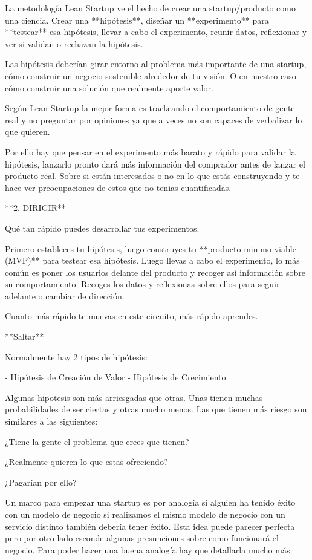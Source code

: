 \documentclass[12pt,twoside,titlepage]{report}
\begin{document}
La metodología Lean Startup ve el hecho de crear una startup/producto como una ciencia. Crear una **hipótesis**, diseñar un **experimento** para **testear** esa hipótesis, llevar a cabo el experimento, reunir datos, reflexionar y ver si validan o rechazan la hipótesis.

Las hipótesis deberían girar entorno al problema más importante de una startup, cómo construir un negocio sostenible alrededor de tu visión. O en nuestro caso cómo construir una solución que realmente aporte valor.

Según Lean Startup la mejor forma es trackeando el comportamiento de gente real y no preguntar por opiniones ya que a veces no son capaces de verbalizar lo que quieren.

Por ello hay que pensar en el experimento más barato y rápido para validar la hipótesis, lanzarlo pronto dará más información del comprador antes de lanzar el producto real. Sobre si están interesados o no en lo que estás construyendo y te hace ver preocupaciones de estos que no tenias cuantificadas.

**2. DIRIGIR**

Qué tan rápido puedes desarrollar tus experimentos.

Primero estableces tu hipótesis, luego construyes tu **producto minimo viable (MVP)** para testear esa hipótesis. Luego llevas a cabo el experimento, lo más común es poner los usuarios delante del producto y recoger así información sobre su comportamiento. Recoges los datos y reflexionas sobre ellos para seguir adelante o cambiar de dirección. 

Cuanto más rápido te muevas en este circuito, más rápido aprendes.

**Saltar**

Normalmente hay 2 tipos de hipótesis: 

- Hipótesis de Creación de Valor
- Hipótesis de Crecimiento

Algunas hipotesis son más arriesgadas que otras. Unas tienen muchas probabilidades de ser ciertas y otras mucho menos. Las que tienen más riesgo son similares a las siguientes: 

¿Tiene la gente el problema que crees que tienen?

¿Realmente quieren lo que estas ofreciendo?

¿Pagarían por ello?

Un marco para empezar una startup es por analogía si alguien ha tenido éxito con un modelo de negocio si realizamos el mismo modelo de negocio con un servicio distinto también debería tener éxito. Esta idea puede parecer perfecta pero por otro lado esconde algunas presunciones sobre como funcionará el negocio. Para poder hacer una buena analogía hay que detallarla mucho más.
\end{document}
